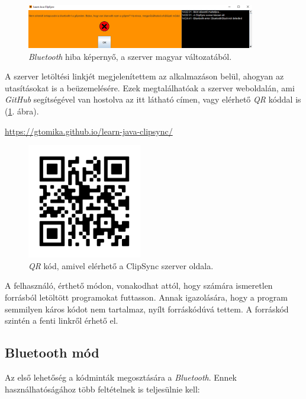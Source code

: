 \documentclass[12pt,a4paper]{article}
\begin{document}
	\begin{figure}[h!]
		\centering
		\includegraphics[width=10cm]{clipsync_server_error}
		\caption{\textit{Bluetooth} hiba képernyő, a szerver magyar változatából.}
	\end{figure}
	
	A szerver letöltési linkjét megjelenítettem az alkalmazáson belül, ahogyan az utasításokat is a beüzemelésére. Ezek megtalálhatóak a szerver weboldalán, ami \textit{GitHub} segítségével van hostolva az itt látható címen, vagy elérhető \textit{QR} kóddal is (\ref{qr_clipsync}. ábra).
	
	\begin{center}
		\url{https://gtomika.github.io/learn-java-clipsync/}
	\end{center}

	\begin{figure}[h!]
		\centering
		\includegraphics[width=5cm]{clipsync_server_qr}
		\caption{\textit{QR} kód, amivel elérhető a ClipSync szerver oldala.}
		\label{qr_clipsync}
	\end{figure}

	A felhasználó, érthető módon, vonakodhat attól, hogy számára ismeretlen forrásból letöltött programokat futtasson. Annak igazolására, hogy a program semmilyen káros kódot nem tartalmaz, nyílt forráskódúvá tettem. A forráskód szintén a fenti linkről érhető el.
	
	\subsection{Bluetooth mód}
	
	Az első lehetőség a kódminták megosztására a \textit{Bluetooth}. Ennek használhatóságához több feltételnek is teljesülnie kell:
	
\end{document}
